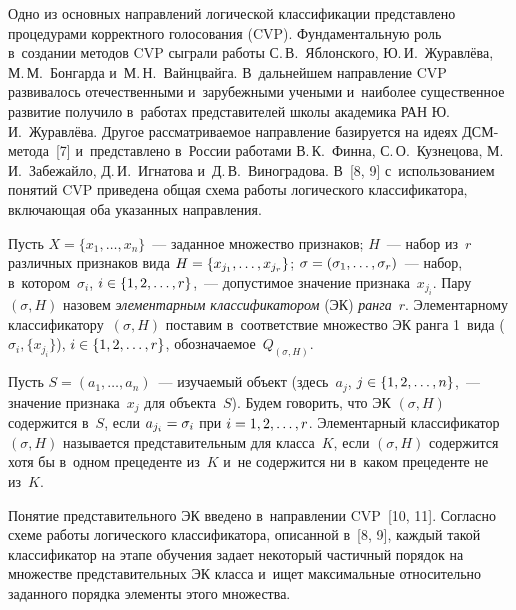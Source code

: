 \begin{multicols}{2}
  Одно из основных направлений логической классификации представлено 
процедурами корректного голосования (CVP). 
Фундаментальную роль в~создании методов CVP сыграли работы 
С.\,В.~Яблонского, Ю.\,И.~Журавлёва, М.\,М.~Бонгарда и~М.\,Н.~Вайнцвайга. 
В~дальнейшем направление CVP развивалось отечественными и~зарубежными 
учеными и~наиболее существенное развитие получило в~работах 
представителей школы академика РАН Ю.\,И.~Журавлёва. Другое 
рас\-смат\-ри\-ва\-емое на\-прав\-ле\-ние базируется на идеях ДСМ-ме\-то\-да~[7] и~пред\-став\-ле\-но в~России работами В.\,К.~Финна, С.\,О.~Кузнецова, 
М.\,И.~Забежайло, Д.\,И.~Игнатова и~Д.\,В.~Виноградова. В~[8, 9] 
с~использованием понятий CVP приведена общая схема работы логического 
классификатора, включающая оба указанных направления. 
  
  Пусть $X=\{x_1, \ldots , x_n\}$~--- заданное множество признаков; $H$~--- 
набор из~$r$ различных признаков вида $H\hm= \{ x_{j_1},\ldots , x_{j_r}\}$; 
$\sigma\hm= (\sigma_1, \ldots , \sigma_r)$~--- набор, в~котором~$\sigma_i$, 
$i\hm\in \{1, 2, \ldots , r\}$,~--- допустимое значение признака~$x_{j_i}$. Пару 
$(\sigma, H)$ назовем \textit{элементарным классификатором} (ЭК) 
\textit{ранга}~$r$. Элементарному классификатору~$(\sigma, H)$ поставим в~соответствие множество ЭК 
ранга 1~вида ($\sigma_i, \{ x_{j_i}\}$), $i\hm\in \{1,2,\ldots , r\}$, обозначаемое~$Q_{(\sigma, H)}$. 
  
  Пусть $S=(a_1, \ldots , a_n)$~--- изучаемый объект (здесь~$a_j$, $j\hm\in 
\{1,2,\ldots , n\}$,~--- значение признака~$x_j$ для объекта~$S$). Будем 
говорить, что ЭК $(\sigma, H)$ содержится в~$S$, если $a_{j_i}\hm=\sigma_i$ 
при $i\hm= 1,2,\ldots , r$. Элементарный классификатор~$(\sigma, H)$ называется представительным для 
класса~$K$, если $(\sigma, H)$ содержится хотя бы в~одном прецеденте из~$K$ и~не содержится ни в~каком прецеденте не из~$K$. 
  
  Понятие представительного ЭК введено в~направлении CVP~[10, 11]. 
Согласно схеме работы логического классификатора, описанной в~[8, 9], 
каждый такой классификатор на этапе обучения задает некоторый час\-тич\-ный 
порядок на множестве представительных ЭК класса и~ищет максимальные 
относительно заданного порядка элементы этого множества. 
  

\end{multicols}
